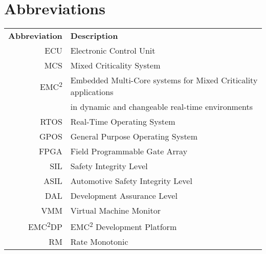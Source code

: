 \chapter*{Abbreviations}
\begin{tabular}{r l}
\textbf{Abbreviation} 	& \textbf{Description} \vspace{.5em} \\
ECU		&Electronic Control Unit\\
MCS		&Mixed Criticality System\\
EMC\textsuperscript{2}	&Embedded Multi-Core systems for Mixed Criticality applications\\
 		&in dynamic and changeable real-time environments\\
RTOS	&Real-Time Operating System\\
GPOS	&General Purpose Operating System\\
FPGA	&Field Programmable Gate Array\\
SIL		&Safety Integrity Level\\
ASIL	&Automotive Safety Integrity Level\\
DAL		&Development Assurance Level\\
VMM		&Virtual Machine Monitor\\
EMC\textsuperscript{2}DP	&EMC\textsuperscript{2} Development Platform\\
RM		&Rate Monotonic\\

\end{tabular}